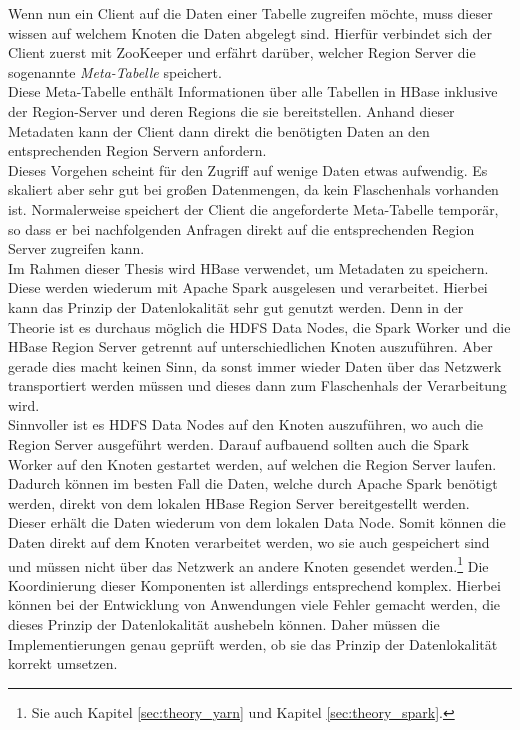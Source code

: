 \noindent
Wenn nun ein Client auf die Daten einer Tabelle zugreifen möchte, muss dieser wissen auf welchem Knoten die Daten abgelegt sind. Hierfür verbindet sich der Client zuerst mit ZooKeeper und erfährt darüber, welcher Region Server die sogenannte \textit{Meta-Tabelle} speichert.\cite[S. 579]{hadoop_definitive_guide}\\
Diese Meta-Tabelle enthält Informationen über alle Tabellen in HBase inklusive der Region-Server und deren Regions die sie bereitstellen. Anhand dieser Metadaten kann der Client dann direkt die benötigten Daten an den entsprechenden Region Servern anfordern.\\
Dieses Vorgehen scheint für den Zugriff auf wenige Daten etwas aufwendig. Es skaliert aber sehr gut bei großen Datenmengen, da kein Flaschenhals vorhanden ist. Normalerweise speichert der Client die angeforderte Meta-Tabelle temporär, so dass er bei nachfolgenden Anfragen direkt auf die entsprechenden Region Server zugreifen kann.\\ 

\noindent
Im Rahmen dieser Thesis wird HBase verwendet, um Metadaten zu speichern. Diese werden wiederum mit Apache Spark ausgelesen und verarbeitet. Hierbei kann das Prinzip der Datenlokalität sehr gut genutzt werden. Denn in der Theorie ist es durchaus möglich die HDFS Data Nodes, die Spark Worker und die HBase Region Server getrennt auf unterschiedlichen Knoten auszuführen. Aber gerade dies macht keinen Sinn, da sonst immer wieder Daten über das Netzwerk transportiert werden müssen und dieses dann zum Flaschenhals der Verarbeitung wird.\\
Sinnvoller ist es HDFS Data Nodes auf den Knoten auszuführen, wo auch die Region Server ausgeführt werden. Darauf aufbauend sollten auch die Spark Worker auf den Knoten gestartet werden, auf welchen die Region Server laufen. Dadurch können im besten Fall die Daten, welche durch Apache Spark benötigt werden, direkt von dem lokalen HBase Region Server bereitgestellt werden. Dieser erhält die Daten wiederum von dem lokalen Data Node. Somit können die Daten direkt auf dem Knoten verarbeitet werden, wo sie auch gespeichert sind und müssen nicht über das Netzwerk an andere Knoten gesendet werden.\footnote{Sie auch Kapitel \ref{sec:theory_yarn} und Kapitel \ref{sec:theory_spark}.} Die Koordinierung dieser Komponenten ist allerdings entsprechend komplex. Hierbei können bei der Entwicklung von Anwendungen viele Fehler gemacht werden, die dieses Prinzip der Datenlokalität aushebeln können. Daher müssen die Implementierungen genau geprüft werden, ob sie das Prinzip der Datenlokalität korrekt umsetzen.\\

